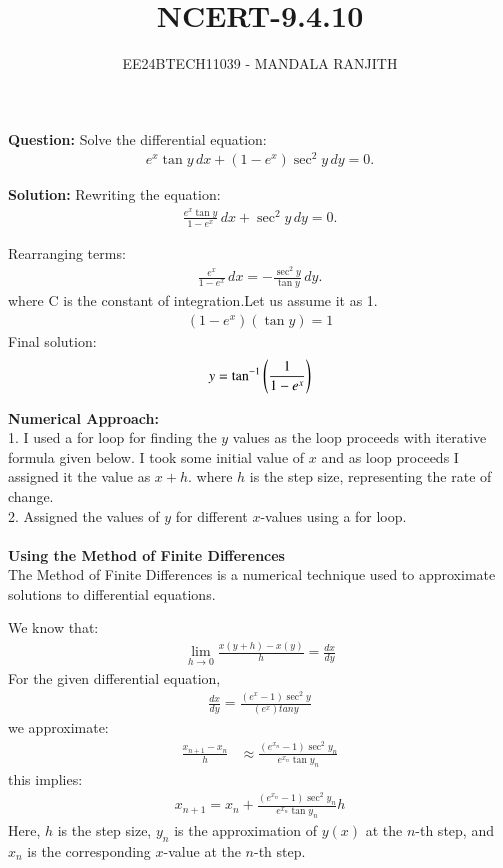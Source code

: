 \documentclass[article]{IEEEtran}
\numberwithin{figure}{enumi}
\begin{document}

\title{NCERT-9.4.10}
\author{EE24BTECH11039 - MANDALA RANJITH}
{\let\newpage\relax\maketitle}
\noindent\textbf{Question: }  
Solve the differential equation:  
\begin{align}
e^x \tan y \, dx + (1 - e^x) \sec^2 y \, dy = 0.
\end{align}

\noindent\textbf{Solution:}  
Rewriting the equation:  
\begin{align}
\frac{e^x \tan y}{1 - e^x} \, dx + \sec^2 y \, dy = 0.
\end{align}

\noindent Rearranging terms:  
\begin{align}
\frac{e^x}{1 - e^x} \, dx = -\frac{\sec^2 y}{\tan y} \, dy.
\end{align}
where C is the constant of integration.Let us assume it as 1.\\
\begin{align}
(1-e^x)(\tan y)=1
\end{align}
\noindent Final solution:  
\begin{align}
y=\tan^{-1}\left(\frac{1}{1-e^x}\right)
\end{align}

\noindent\textbf{Numerical Approach:}\\1. I used a for loop for finding the $y$ values as the loop proceeds with iterative formula given below. I took some initial value of $x$ and as loop proceeds I assigned it the value as $x+h$. where $h$ is the step size, representing the rate of change. 
\\2. Assigned the values of $y$ for different $x$-values using a for loop. \\ 
\\ \textbf{Using the Method of Finite Differences}\\
The Method of Finite Differences is a numerical technique used to approximate solutions to differential equations. 

We know that:
\begin{align}
   \lim_{h \to 0} \frac{x(y+h) - x(y)}{h} = \frac{dx}{dy} 
\end{align}
For the given differential equation,
\begin{align}
    \frac{dx}{dy}=\frac{(e^x-1) \sec^2y}{(e^x) tany}
\end{align}
we approximate:
\begin{align}
\frac{x_{n+1} - x_n}{h} &\approx \frac{(e^{x_n}-1) \sec^2y_n}{e^{x_n} \tan{y_n}}
\end{align}
this implies:
\begin{align}
    {x_{n+1}}= {x_n + \frac{(e^{x_n}-1) \sec^2y_n}{e^{x_n} \tan{y_n}}}h
\end{align}
Here, $h$ is the step size, $y_n$ is the approximation of $y(x)$ at the $n$-th step, and $x_n$ is the corresponding $x$-value at the $n$-th step.
\end{document}
